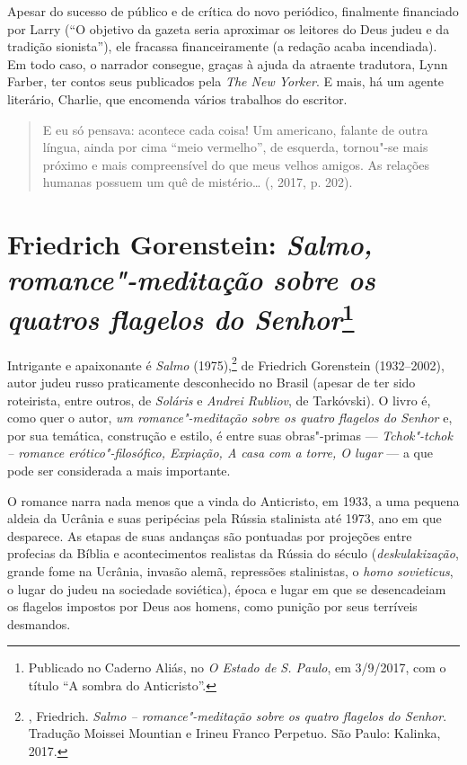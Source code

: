 Apesar do sucesso de público e de crítica do novo periódico,
finalmente financiado por Larry (``O objetivo da gazeta seria
aproximar os leitores do Deus judeu e da tradição sionista''), ele
fracassa financeiramente (a redação acaba incendiada).
Em todo caso, o narrador consegue, graças à ajuda da atraente
tradutora, Lynn Farber, ter contos seus publicados pela
\emph{The New Yorker}. E mais, há um agente literário,
Charlie, que encomenda vários trabalhos do escritor.

\begin{quotation}
E eu só pensava: acontece cada coisa! Um americano, falante de outra língua, ainda por cima ``meio vermelho'', de esquerda, tornou"-se mais próximo e mais compreensível do que meus velhos amigos. As relações humanas possuem um quê de mistério\ldots{} (, 2017, p. 202).

\end{quotation}

\chapter*{Friedrich Gorenstein: \emph{Salmo, romance"-meditação sobre os quatros flagelos do Senhor}\footnote{Publicado no Caderno Aliás, no \emph{O Estado de S. Paulo}, em 3/9/2017, com o título ``A sombra do Anticristo''.}}

\label{gorenstein}

Intrigante e apaixonante é \emph{Salmo} (1975),\footnote{, Friedrich. 
\emph{Salmo -- romance"-meditação sobre os quatro flagelos do Senhor}. 
Tradução Moissei Mountian e Irineu Franco Perpetuo. São Paulo: Kalinka,
 2017.} de Friedrich Gorenstein (1932--2002), autor judeu russo
praticamente desconhecido no Brasil (apesar de ter sido roteirista, entre outros, de \emph{Soláris}
e \emph{Andrei Rubliov}, de Tarkóvski). O livro é, como quer o autor,
\emph{um romance"-meditação sobre os quatro flagelos do Senhor} e,
por sua temática, construção e estilo, é entre suas obras"-primas
--- \emph{Tchok"-tchok -- romance erótico"-filosófico, Expiação, A casa com a
torre, O lugar} --- a que pode ser considerada a mais importante.

O romance narra nada menos que a vinda do Anticristo, em 1933, a uma
pequena aldeia da Ucrânia e suas peripécias pela Rússia stalinista até
1973, ano em que desparece. As etapas de suas andanças são pontuadas por
projeções entre profecias da Bíblia e acontecimentos realistas da Rússia
do século  (\emph{deskulakização}, grande fome na Ucrânia, invasão alemã,
repressões stalinistas, o \emph{homo sovieticus}, o lugar do judeu na
sociedade soviética), época e lugar em que se desencadeiam os flagelos
impostos por Deus aos homens, como punição por seus terríveis desmandos.

